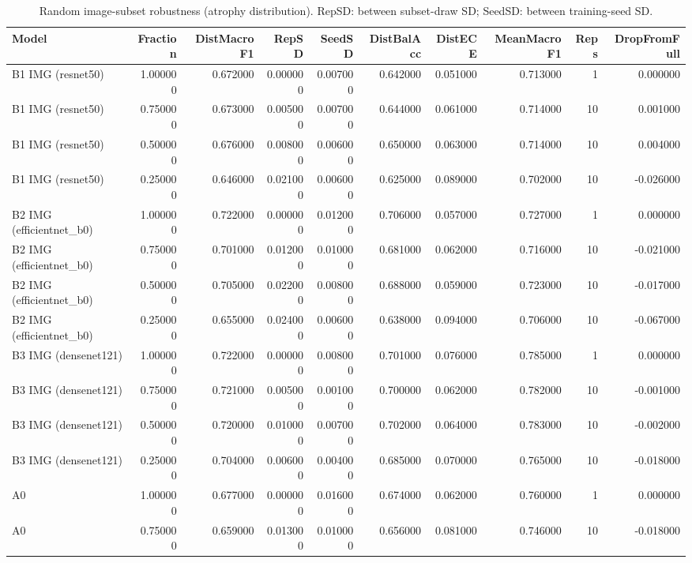 \begin{table}
\caption{Random image-subset robustness (atrophy distribution). RepSD: between subset-draw SD; SeedSD: between training-seed SD.}
\label{tab:table6_missing_view}
\begin{tabular}{lrrrrrrrrr}
\toprule
Model & Fraction & DistMacroF1 & RepSD & SeedSD & DistBalAcc & DistECE & MeanMacroF1 & Reps & DropFromFull \\
\midrule
B1 IMG (resnet50) & 1.000000 & 0.672000 & 0.000000 & 0.007000 & 0.642000 & 0.051000 & 0.713000 & 1 & 0.000000 \\
B1 IMG (resnet50) & 0.750000 & 0.673000 & 0.005000 & 0.007000 & 0.644000 & 0.061000 & 0.714000 & 10 & 0.001000 \\
B1 IMG (resnet50) & 0.500000 & 0.676000 & 0.008000 & 0.006000 & 0.650000 & 0.063000 & 0.714000 & 10 & 0.004000 \\
B1 IMG (resnet50) & 0.250000 & 0.646000 & 0.021000 & 0.006000 & 0.625000 & 0.089000 & 0.702000 & 10 & -0.026000 \\
B2 IMG (efficientnet\_b0) & 1.000000 & 0.722000 & 0.000000 & 0.012000 & 0.706000 & 0.057000 & 0.727000 & 1 & 0.000000 \\
B2 IMG (efficientnet\_b0) & 0.750000 & 0.701000 & 0.012000 & 0.010000 & 0.681000 & 0.062000 & 0.716000 & 10 & -0.021000 \\
B2 IMG (efficientnet\_b0) & 0.500000 & 0.705000 & 0.022000 & 0.008000 & 0.688000 & 0.059000 & 0.723000 & 10 & -0.017000 \\
B2 IMG (efficientnet\_b0) & 0.250000 & 0.655000 & 0.024000 & 0.006000 & 0.638000 & 0.094000 & 0.706000 & 10 & -0.067000 \\
B3 IMG (densenet121) & 1.000000 & 0.722000 & 0.000000 & 0.008000 & 0.701000 & 0.076000 & 0.785000 & 1 & 0.000000 \\
B3 IMG (densenet121) & 0.750000 & 0.721000 & 0.005000 & 0.001000 & 0.700000 & 0.062000 & 0.782000 & 10 & -0.001000 \\
B3 IMG (densenet121) & 0.500000 & 0.720000 & 0.010000 & 0.007000 & 0.702000 & 0.064000 & 0.783000 & 10 & -0.002000 \\
B3 IMG (densenet121) & 0.250000 & 0.704000 & 0.006000 & 0.004000 & 0.685000 & 0.070000 & 0.765000 & 10 & -0.018000 \\
A0 & 1.000000 & 0.677000 & 0.000000 & 0.016000 & 0.674000 & 0.062000 & 0.760000 & 1 & 0.000000 \\
A0 & 0.750000 & 0.659000 & 0.013000 & 0.010000 & 0.656000 & 0.081000 & 0.746000 & 10 & -0.018000 \\

\end{tabular}
\end{table}
